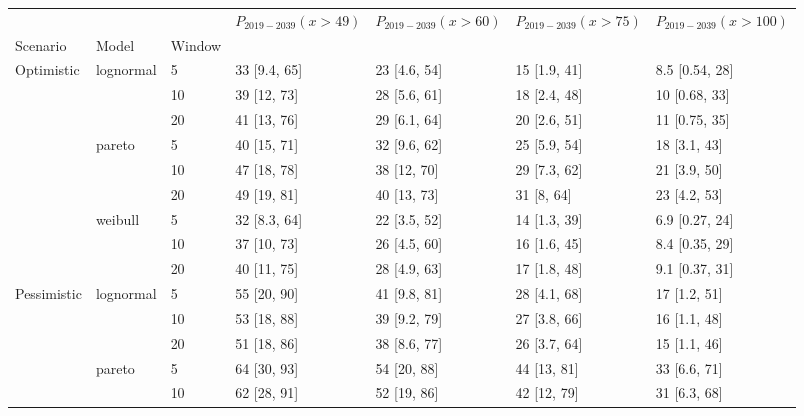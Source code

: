 \begin{tabular}{lllllll}
\toprule
           &         &    & $P_{2019-2039}(x>49)$ & $P_{2019-2039}(x>60)$ & $P_{2019-2039}(x>75)$ & $P_{2019-2039}(x>100)$ \\
Scenario & Model & Window &                       &                       &                       &                        \\
\midrule
Optimistic & lognormal & 5  &          33 [9.4, 65] &          23 [4.6, 54] &          15 [1.9, 41] &         8.5 [0.54, 28] \\
           &         & 10 &           39 [12, 73] &          28 [5.6, 61] &          18 [2.4, 48] &          10 [0.68, 33] \\
           &         & 20 &           41 [13, 76] &          29 [6.1, 64] &          20 [2.6, 51] &          11 [0.75, 35] \\
           & pareto & 5  &           40 [15, 71] &          32 [9.6, 62] &          25 [5.9, 54] &           18 [3.1, 43] \\
           &         & 10 &           47 [18, 78] &           38 [12, 70] &          29 [7.3, 62] &           21 [3.9, 50] \\
           &         & 20 &           49 [19, 81] &           40 [13, 73] &            31 [8, 64] &           23 [4.2, 53] \\
           & weibull & 5  &          32 [8.3, 64] &          22 [3.5, 52] &          14 [1.3, 39] &         6.9 [0.27, 24] \\
           &         & 10 &           37 [10, 73] &          26 [4.5, 60] &          16 [1.6, 45] &         8.4 [0.35, 29] \\
           &         & 20 &           40 [11, 75] &          28 [4.9, 63] &          17 [1.8, 48] &         9.1 [0.37, 31] \\
Pessimistic & lognormal & 5  &           55 [20, 90] &          41 [9.8, 81] &          28 [4.1, 68] &           17 [1.2, 51] \\
           &         & 10 &           53 [18, 88] &          39 [9.2, 79] &          27 [3.8, 66] &           16 [1.1, 48] \\
           &         & 20 &           51 [18, 86] &          38 [8.6, 77] &          26 [3.7, 64] &           15 [1.1, 46] \\
           & pareto & 5  &           64 [30, 93] &           54 [20, 88] &           44 [13, 81] &           33 [6.6, 71] \\
           &         & 10 &           62 [28, 91] &           52 [19, 86] &           42 [12, 79] &           31 [6.3, 68] \\

\end{tabular}
